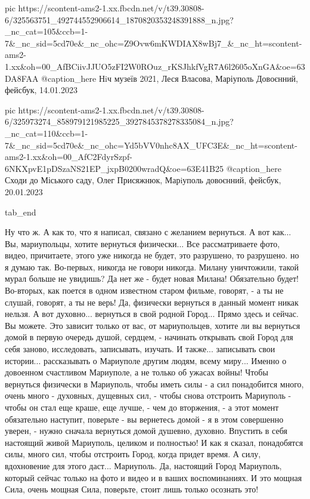 
     pic https://scontent-ams2-1.xx.fbcdn.net/v/t39.30808-6/325563751_492744552906614_1870820353248391888_n.jpg?_nc_cat=105&ccb=1-7&_nc_sid=5cd70e&_nc_ohc=Z9Ovw6mKWDIAX8wBj7_&_nc_ht=scontent-ams2-1.xx&oh=00_AfBCiivJJUO5zFI2W0ROuz_rKSJhkfVgR7A6l2605oXnGA&oe=63DA8FAA
     @caption_here Нiч музеїв 2021, Леся Власова, Маріуполь Довоєнний, фейсбук, 14.01.2023

     pic https://scontent-ams2-1.xx.fbcdn.net/v/t39.30808-6/325973274_858979121985225_3927845378278335084_n.jpg?_nc_cat=110&ccb=1-7&_nc_sid=5cd70e&_nc_ohc=Yd5bVV0nhc8AX_UFC3E&_nc_ht=scontent-ams2-1.xx&oh=00_AfC2FdyrSzpf-6NKXpvE1pDSzaNS21EP_jxpB0200wradQ&oe=63E41B25
     @caption_here Сходи до Міського саду, Олег Присяжнюк, Марiуполь довоєнний, фейсбук, 20.01.2023

  tab_end
\fi

Ну что ж. А как то, что я написал, связано с желанием вернуться. А вот как...
Вы, мариупольцы, хотите вернуться физически... Все рассматриваете фото, видео,
причитаете, этого уже никогда не будет, это разрушено, то разрушено. но я думаю
так. Во-первых, никогда не говори никогда. Милану уничтожили, такой мурал
больше не увидишь?  Да нет же - будет новая Милана! Обязательно будет!
Во-вторых, как поется в одном известном старом фильме, говорят, - а ты не
слушай, говорят, а ты не верь! Да, физически вернуться в данный момент никак
нельзя.  А вот духовно... вернуться в свой родной Город... Прямо здесь и
сейчас. Вы можете.  Это зависит только от вас, от мариупольцев, хотите ли вы
вернуться домой в первую очередь душой, сердцем, - начинать открывать свой
Город для себя заново, исследовать, записывать, изучать. И также...  записывать
свои истории...  рассказывать о Мариуполе другим людям, всему миру... Именно о
довоенном счастливом Мариуполе, а не только об ужасах войны!  Чтобы вернуться
физически в Мариуполь, чтобы иметь силы - а сил понадобится много, очень много
- духовных, дущевных сил, - чтобы снова отстроить Мариуполь - чтобы он стал еще
краше, еще лучше, - чем до вторжения, - а этот момент обязательно наступит,
поверьте - вы вернетесь домой - я в этом совершенно уверен, - нужно сначала
вернуться домой душевно, духовно.  Впустить в себя настоящий живой Мариуполь,
целиком и полностью!  И как я сказал, понадобятся силы, много сил, чтобы
отстроить Город, когда придет время.  А силу, вдохновение для этого даст...
Мариуполь. Да, настоящий Город Мариуполь, который сейчас только на фото и видео
и в ваших воспоминаниях.  И это мощная Сила, очень мощная Сила, поверьте, стоит
лишь только осознать это!

